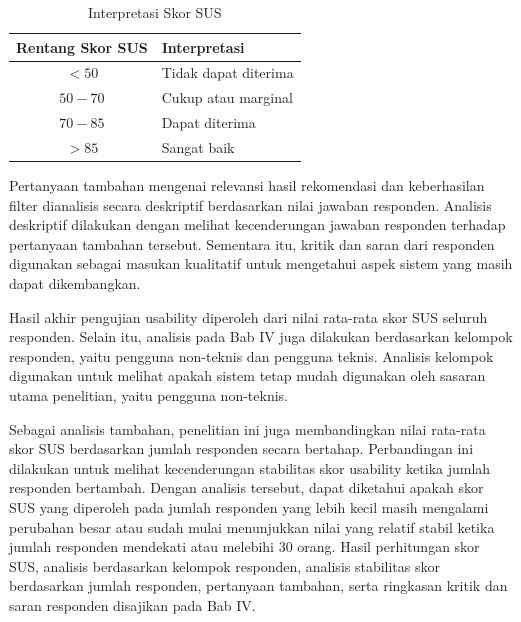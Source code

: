 \begin{table}[htbp]
\centering
\caption{Interpretasi Skor SUS}
\label{tab:interpretasi_sus}
\begin{tabular}{|c|l|}
\hline
\textbf{Rentang Skor SUS} & \textbf{Interpretasi} \\ \hline
$< 50$ & Tidak dapat diterima \\ \hline
$50 - 70$ & Cukup atau marginal \\ \hline
$70 - 85$ & Dapat diterima \\ \hline
$> 85$ & Sangat baik \\ \hline
\end{tabular}
\end{table}

Pertanyaan tambahan mengenai relevansi hasil rekomendasi dan keberhasilan filter dianalisis secara deskriptif berdasarkan nilai jawaban responden. Analisis deskriptif dilakukan dengan melihat kecenderungan jawaban responden terhadap pertanyaan tambahan tersebut. Sementara itu, kritik dan saran dari responden digunakan sebagai masukan kualitatif untuk mengetahui aspek sistem yang masih dapat dikembangkan.

Hasil akhir pengujian usability diperoleh dari nilai rata-rata skor SUS seluruh responden. Selain itu, analisis pada Bab IV juga dilakukan berdasarkan kelompok responden, yaitu pengguna non-teknis dan pengguna teknis. Analisis kelompok digunakan untuk melihat apakah sistem tetap mudah digunakan oleh sasaran utama penelitian, yaitu pengguna non-teknis.

Sebagai analisis tambahan, penelitian ini juga membandingkan nilai rata-rata skor SUS berdasarkan jumlah responden secara bertahap. Perbandingan ini dilakukan untuk melihat kecenderungan stabilitas skor usability ketika jumlah responden bertambah. Dengan analisis tersebut, dapat diketahui apakah skor SUS yang diperoleh pada jumlah responden yang lebih kecil masih mengalami perubahan besar atau sudah mulai menunjukkan nilai yang relatif stabil ketika jumlah responden mendekati atau melebihi 30 orang. Hasil perhitungan skor SUS, analisis berdasarkan kelompok responden, analisis stabilitas skor berdasarkan jumlah responden, pertanyaan tambahan, serta ringkasan kritik dan saran responden disajikan pada Bab IV.
